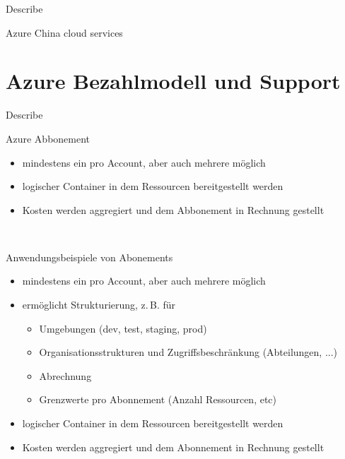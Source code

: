 \documentclass{scrartcl}
\newenvironment{flashcard}[2][]{%
    #1
    \vfill
    \centerline{\Large{#2}}
    \vfill
\newpage
}
{\newpage}
\newcommand{\sectioncard}[1]{
    \vspace*{\stretch{1}}
    \section{#1}
    \vspace*{\stretch{1}}
    \pagebreak
}
\begin{document}
    \begin{flashcard}[Describe]{Azure China cloud services}

    \end{flashcard}

    \sectioncard{Azure Bezahlmodell und Support}

    \begin{flashcard}[Describe]{Azure Abbonement}
        \begin{itemize}
            \item mindestens ein pro Account, aber auch mehrere möglich
            \item logischer Container in dem Ressourcen bereitgestellt werden
            \item Kosten werden aggregiert und dem Abbonement in Rechnung gestellt
        \end{itemize}
    \end{flashcard}

    \begin{flashcard}[\ ]{Anwendungsbeispiele von Abonements}
        \begin{itemize}
            \item mindestens ein pro Account, aber auch mehrere möglich
            \item ermöglicht Strukturierung, z.\,B. für
            \begin{itemize}
                \item Umgebungen (dev, test, staging, prod)
                \item Organisationsstrukturen und Zugriffsbeschränkung (Abteilungen, ...)
                \item Abrechnung
                \item Grenzwerte pro Abonnement (Anzahl Ressourcen, etc)
            \end{itemize}
            \item logischer Container in dem Ressourcen bereitgestellt werden
            \item Kosten werden aggregiert und dem Abonnement in Rechnung gestellt
        \end{itemize}
    \end{flashcard}
\end{document}
